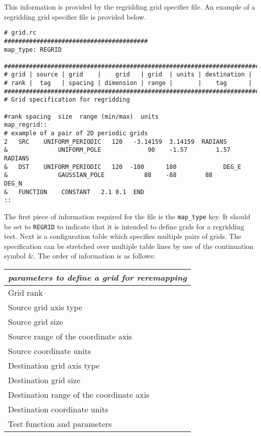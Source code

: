 This information is provided by the regridding grid specifier file.
An example of a regridding grid specifier file is provided below. 
\begin{center}
\begin{verbatim}
# grid.rc
########################################
map_type: REGRID

################################################################################
# grid | source | grid    |    grid   | grid  | units | destination | 
# rank |  tag   | spacing | dimension | range |       |    tag      |
################################################################################
# Grid specification for regridding

#rank spacing  size  range (min/max)  units
map_regrid::
# example of a pair of 2D periodic grids 
2   SRC    UNIFORM_PERIODIC   120   -3.14159  3.14159  RADIANS   
&              UNIFORM_POLE             90    -1.57        1.57        RADIANS   
&   DST    UNIFORM_PERIODIC   120  -180      180             DEG_E   
&              GAUSSIAN_POLE           88    -88        88             DEG_N   
&   FUNCTION    CONSTANT   2.1 0.1  END
::
\end{verbatim}
\end{center}

The first piece of information required for the file is the \texttt{map\_type} key. It should be set to \texttt{REGRID} to indicate that it is intended to define grids for a regridding test. Next is a configuration table which specifies multiple pairs of grids. The specification can be stretched over multiple table lines by use of the continuation symbol $\&$. The order of information is as follows:
\begin{center}
\begin{tabular}{| l |} \hline 
{\em parameters to define a grid for reremapping }  \\
\hline \hline
 Grid rank    \\
 Source grid axis type   \\
 Source grid size \\
 Source range of the coordinate axis  \\
 Source coordinate units \\
 Destination grid axis type   \\
 Destination grid size \\
 Destination range of the coordinate axis  \\
 Destination coordinate units \\
 Test function and parameters \\
\hline 
\end{tabular}
\end{center}

